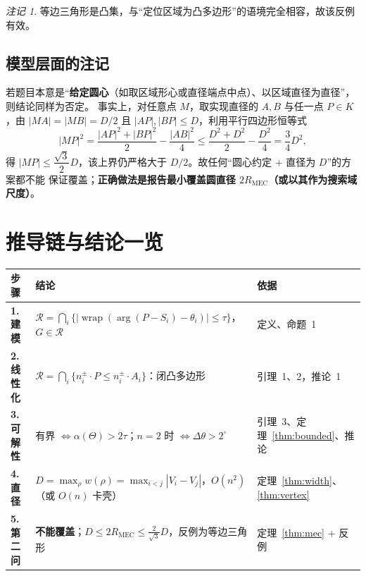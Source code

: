 \documentclass[11pt,a4paper]{ctexart}
\theoremstyle{definition}
\theoremstyle{remark}
\newtheorem{remark}[theorem]{注记}
\newcommand{\argvec}{\arg}
\newcommand{\wrap}{\operatorname{wrap}}
\newcommand{\MEC}{\operatorname{MEC}}
\begin{document}
\begin{remark}
等边三角形是凸集，与“定位区域为凸多边形”的语境完全相容，故该反例有效。
\end{remark}

\subsection{模型层面的注记}

若题目本意是“\textbf{给定圆心}（如取区域形心或直径端点中点）、以区域直径为直径”，则结论同样为否定。
事实上，对任意点 $M$，取实现直径的 $A,B$ 与任一点 $P\in K$，由
$|MA|=|MB|=D/2$ 且 $|AP|,|BP|\le D$，利用平行四边形恒等式
\[
|MP|^2=\frac{|AP|^2+|BP|^2}{2}-\frac{|AB|^2}{4}\le\frac{D^2+D^2}{2}-\frac{D^2}{4}=\frac34D^2,
\]
得 $|MP|\le\dfrac{\sqrt3}{2}D$，该上界仍严格大于 $D/2$。故任何“圆心约定 $+$ 直径为 $D$”的方案都不能
保证覆盖；\textbf{正确做法是报告最小覆盖圆直径 $2R_{\MEC}$（或以其作为搜索域尺度）}。

\section{推导链与结论一览}

\begin{table}[h]
\centering
\small
\renewcommand{\arraystretch}{1.3}
\begin{tabular}{>{\bfseries}lll}
\toprule
步骤 & 结论 & 依据 \\
\midrule
1. 建模 & $\mathcal R=\bigcap_i\{\lvert\wrap(\argvec(P-S_i)-\theta_i)\rvert\le\tau\}$，$G\in\mathcal R$ & 定义、命题~1 \\
2. 线性化 & $\mathcal R=\bigcap_i\{n_i^{\pm}\!\cdot P\le n_i^{\pm}\!\cdot A_i\}$：闭凸多边形 & 引理~1、2，推论~1 \\
3. 可解性 & 有界 $\iff\alpha(\Theta)>2\tau$；$n=2$ 时 $\iff\Delta\theta>2^\circ$ & 引理~3、定理~\ref{thm:bounded}、推论 \\
4. 直径 & $D=\max_\rho w(\rho)=\max_{i<j}|V_i-V_j|$，$O(n^2)$（或 $O(n)$ 卡壳） & 定理~\ref{thm:width}、\ref{thm:vertex} \\
5. 第二问 & \textbf{不能覆盖}；$D\le2R_{\MEC}\le\frac{2}{\sqrt3}D$，反例为等边三角形 & 定理~\ref{thm:mec} + 反例 \\
\bottomrule
\end{tabular}
\end{table}
\end{document}
